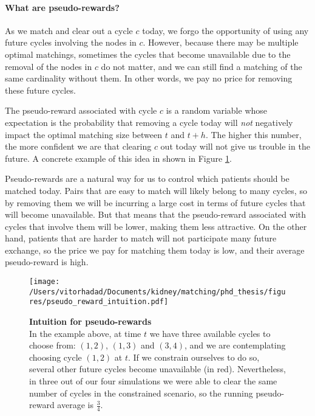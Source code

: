 \begin{itemize}
\paragraph{What are pseudo-rewards?} As we match and clear out a cycle $c$ today, we forgo the opportunity of using any future cycles involving the nodes in $c$. However, because there may be multiple optimal matchings, sometimes the cycles that become unavailable due to the removal of the nodes in $c$ do not matter, and we can still find a matching of the same cardinality without them. In other words, we pay no price for removing these future cycles.
 
The pseudo-reward associated with cycle $c$ is a random variable whose expectation is the probability that removing a cycle today will \emph{not} negatively impact the optimal matching size between $t$ and $t+h$. The higher this number, the more confident we are that clearing $c$ out today will not give us trouble in the future. A concrete example of this idea in shown in Figure \ref{fig:pseudo_reward_intuition}.

Pseudo-rewards are a natural way for us to control which patients should be matched today. Pairs that are easy to match will likely belong to many cycles, so by removing them we will be incurring a large cost in terms of future cycles that will become unavailable. But that means that the pseudo-reward associated with cycles that involve them will be lower, making them less attractive. On the other hand, patients that are harder to match will not participate many future exchange, so the price we pay for matching them today is low, and their average pseudo-reward is high. 

\begin{landscape}
\begin{figure}[h]
\centering
\texttt{[image: /Users/vitorhadad/Documents/kidney/matching/phd\_thesis/figures/pseudo\_reward\_intuition.pdf]}
\caption[Intuition for pseudo-rewards]{\textbf{Intuition for pseudo-rewards} \\
  In the example above, at time $t$ we have three available cycles to choose from: $(1,2)$, $(1,3)$ and $(3,4)$, and we are contemplating choosing cycle $(1,2)$ at $t$. If we  constrain ourselves to do so, several other future cycles become unavailable (in red). Nevertheless, in three out of our four simulations we were able to clear the same number of cycles in the constrained scenario, so the running pseudo-reward average is $\frac{3}{4}$. 
}
\label{fig:pseudo_reward_intuition}
\end{figure}
\end{landscape}



\end{itemize}
